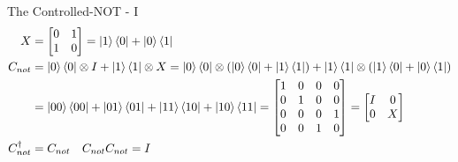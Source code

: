 \documentclass{beamer}
\begin{document}
\begin{frame}{The Controlled-NOT - I}
{\begin{align*}
      X &= \begin{bmatrix} 0 & 1 \\ 1 & 0\end{bmatrix} = \ket{1} \bra{0} + \ket{0} \bra{1} \\
      C_{not} &= \ket0\bra0 \otimes I + \ket1\bra1 \otimes X
              = \ket0\bra0 \otimes (\ket0\bra0 +\ket1\bra1) + \ket1\bra1 \otimes (\ket1\bra0 + \ket0\bra1) \\
              &= \ket{00}\bra{00} + \ket{01}\bra{01} + \ket{11}\bra{10} + \ket{10}\bra{11}
              = \begin{bmatrix} 1 & 0 & 0 & 0 \\ 0 & 1 & 0 & 0 \\ 0 & 0 & 0 & 1 \\ 0 & 0 & 1 & 0 \end{bmatrix} 
              = \begin{bmatrix} I & 0 \\ 0 & X \end{bmatrix} \\
              C_{not}^{\dagger} &= C_{not} \quad C_{not}C_{not} = I
    \end{align*}
  }%
\end{frame}
\end{document}
